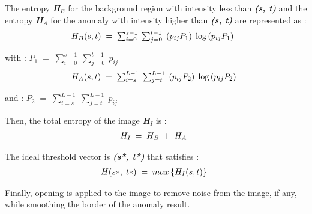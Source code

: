 \documentclass[3p,,preprint,review,12pt]{elsarticle}
\begin{document}
The entropy \textbf{\textit{H}}\textit{\textbf{\ensuremath{_{B}}}} for the background region with intensity less than \textbf{\textit{(s, t) }}and the entropy \textbf{\textit{H}}\textit{\textbf{\ensuremath{_{A}}}} for the anomaly with intensity higher than \textbf{\textit{(s, t)}} are represented as :
\let\saveeqnno\theequation
\let\savefrac\frac
\def\dispfrac{\displaystyle\savefrac}
\begin{eqnarray}
\let\frac\dispfrac
\gdef\theequation{11}
\let\theHequation\theequation
\label{dfg-aef559eebf7e}
\begin{array}{@{}l}H_B(s,t)\;=\;\sum_{i=0}^{s-1}\;\sum_{j=0}^{t-1}\;\left(\frac{p_{ij}}{P_1}\right)\;\log\left(\frac{p_{ij}}{P_1}\right)\;\end{array}
\end{eqnarray}
\global\let\theequation\saveeqnno
\addtocounter{equation}{-1}\ignorespaces 
with : $P_1\;=\;\sum_{i=0}^{s-1}\;\sum_{j=0}^{t-1}\;p_{ij} $
\let\saveeqnno\theequation
\let\savefrac\frac
\def\dispfrac{\displaystyle\savefrac}
\begin{eqnarray}
\let\frac\dispfrac
\gdef\theequation{12}
\let\theHequation\theequation
\label{dfg-39bee333f21c}
\begin{array}{@{}l}H_A(s,t)\;=\;\sum_{i=s}^{L-1}\;\sum_{j=t}^{L-1}\;\left(\frac{p_{ij}}{P_2}\right)\;\log\left(\frac{p_{ij}}{P_2}\right)\end{array}
\end{eqnarray}
\global\let\theequation\saveeqnno
\addtocounter{equation}{-1}\ignorespaces 
and : $P_2\;=\;\sum_{i=s}^{L-1}\;\sum_{j=t}^{L-1}\;p_{ij} $

Then, the total entropy of the image \textbf{\textit{H}}\textit{\textbf{\ensuremath{_{I}}}} is :
\let\saveeqnno\theequation
\let\savefrac\frac
\def\dispfrac{\displaystyle\savefrac}
\begin{eqnarray}
\let\frac\dispfrac
\gdef\theequation{13}
\let\theHequation\theequation
\label{dfg-473dda1c288b}
\begin{array}{@{}l}H_{I\;}=\;H_B\;+\;H_A\end{array}
\end{eqnarray}
\global\let\theequation\saveeqnno
\addtocounter{equation}{-1}\ignorespaces 
The ideal threshold vector is \textbf{\textit{(s*, t*)}} that satisfies : 
\let\saveeqnno\theequation
\let\savefrac\frac
\def\dispfrac{\displaystyle\savefrac}
\begin{eqnarray}
\let\frac\dispfrac
\gdef\theequation{14}
\let\theHequation\theequation
\label{dfg-b0c934e9e147}
\begin{array}{@{}l}H(s\ast,\;t\ast)\;=\;max\left\{H_I(s,t)\right\}\end{array}
\end{eqnarray}
\global\let\theequation\saveeqnno
\addtocounter{equation}{-1}\ignorespaces 
Finally, opening is applied to the image to remove noise from the image, if any, while smoothing the border of the anomaly result.
    
\end{document}
